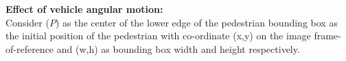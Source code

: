 







\textbf{Effect of vehicle angular motion:} \\
Consider ($P$) as the center of the lower edge of the pedestrian bounding box as the initial position of the pedestrian with co-ordinate (x,y) on the image frame-of-reference and (w,h) as bounding box width and height respectively.

